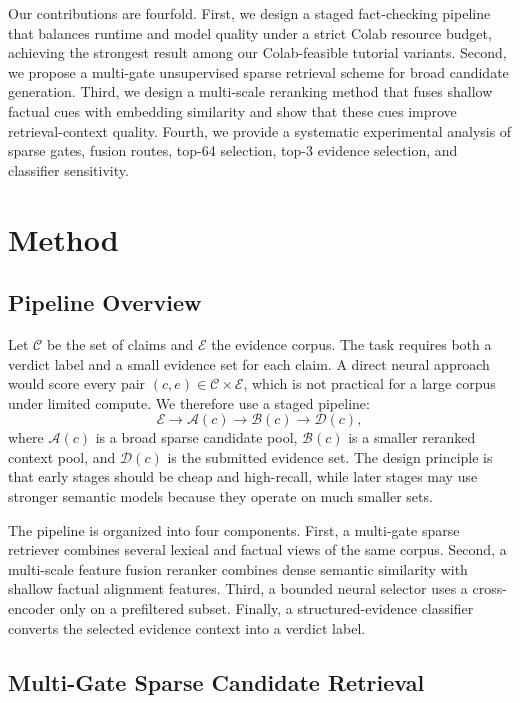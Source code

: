 \documentclass[11pt]{article}
\begin{document}
Our contributions are fourfold.  First, we design a staged fact-checking
pipeline that balances runtime and model quality under a strict Colab resource
budget, achieving the strongest result among our Colab-feasible tutorial
variants.  Second, we propose a multi-gate unsupervised sparse retrieval scheme
for broad candidate generation.  Third, we design a multi-scale reranking
method that fuses shallow factual cues with embedding similarity and show that
these cues improve retrieval-context quality.  Fourth, we provide a systematic
experimental analysis of sparse gates, fusion routes, top-64 selection, top-3
evidence selection, and classifier sensitivity.


\section{Method}

\subsection{Pipeline Overview}

Let $\mathcal{C}$ be the set of claims and $\mathcal{E}$ the evidence corpus.
The task requires both a verdict label and a small evidence set for each claim.
A direct neural approach would score every pair $(c,e)\in\mathcal{C}\times
\mathcal{E}$, which is not practical for a large corpus under limited compute.
We therefore use a staged pipeline:
\[
\mathcal{E}\rightarrow \mathcal{A}(c)\rightarrow \mathcal{B}(c)
\rightarrow \mathcal{D}(c),
\]
where $\mathcal{A}(c)$ is a broad sparse candidate pool, $\mathcal{B}(c)$ is a
smaller reranked context pool, and $\mathcal{D}(c)$ is the submitted evidence
set.  The design principle is that early stages should be cheap and high-recall,
while later stages may use stronger semantic models because they operate on much
smaller sets.

The pipeline is organized into four components.  First, a multi-gate sparse
retriever combines several lexical and factual views of the same corpus.
Second, a multi-scale feature fusion reranker combines dense semantic similarity
with shallow factual alignment features.  Third, a bounded neural selector uses
a cross-encoder only on a prefiltered subset.  Finally, a structured-evidence
classifier converts the selected evidence context into a verdict label.

\subsection{Multi-Gate Sparse Candidate Retrieval}
\end{document}
